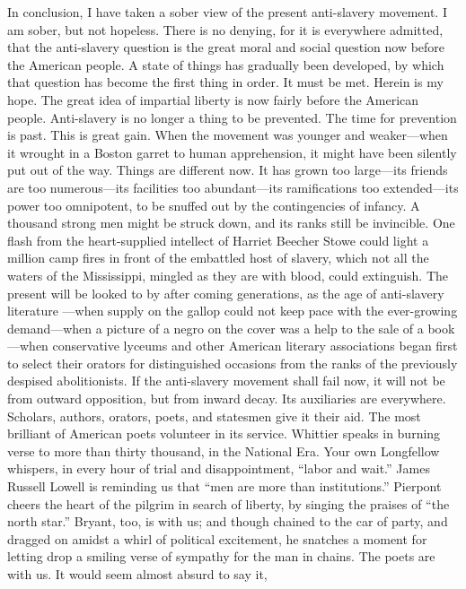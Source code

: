 In conclusion, I have taken a sober view of the present anti-slavery
movement. I am sober, but not hopeless. There is no denying, for it is
everywhere admitted, that the anti-slavery question is the great moral
and social question now before the American people. A state of things
has gradually been developed, by which that question has become the
first thing in order. It must be met. Herein is my hope. The great idea
of impartial liberty is now fairly before the American people.
Anti-slavery is no longer a thing to be prevented. The time for
prevention is past. This is great gain. When the movement was younger
and weaker---when it wrought in a Boston garret to human apprehension,
it might have been silently put out of the way. Things are different
now. It has grown too large---its friends are too numerous---its
facilities too abundant---its ramifications too extended---its power too
omnipotent, to be snuffed out by the contingencies of infancy. A
thousand strong men might be struck down, and its ranks still be
invincible. One flash from the heart-supplied intellect of Harriet
Beecher Stowe could light a million camp fires in front of the embattled
host of slavery, which not all the waters of the Mississippi, mingled as
they are with blood, could extinguish. The present will be looked to by
after coming generations, as the age of anti-slavery literature
{}---when supply on the gallop could not keep pace with the ever-growing
demand---when a picture of a negro on the cover was a help to the sale
of a book---when conservative lyceums and other American literary
associations began first to select their orators for distinguished
occasions from the ranks of the previously despised abolitionists. If
the anti-slavery movement shall fail now, it will not be from outward
opposition, but from inward decay. Its auxiliaries are everywhere.
Scholars, authors, orators, poets, and statesmen give it their aid. The
most brilliant of American poets volunteer in its service. Whittier
speaks in burning verse to more than thirty thousand, in the National
Era. Your own Longfellow whispers, in every hour of trial and
disappointment, ``labor and wait.'' James Russell Lowell is reminding us
that ``men are more than institutions.'' Pierpont cheers the heart of
the pilgrim in search of liberty, by singing the praises of ``the north
star.'' Bryant, too, is with us; and though chained to the car of party,
and dragged on amidst a whirl of political excitement, he snatches a
moment for letting drop a smiling verse of sympathy for the man in
chains. The poets are with us. It would seem almost absurd to say it,
